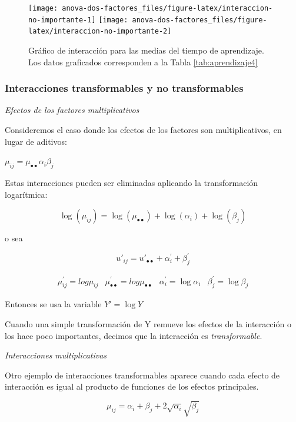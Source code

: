 \documentclass[]{book}
\theoremstyle{definition}
\theoremstyle{definition}
\theoremstyle{definition}
\theoremstyle{remark}
\begin{document}
\begin{figure}
\texttt{[image: anova-dos-factores\_files/figure-latex/interaccion-no-importante-1]} \texttt{[image: anova-dos-factores\_files/figure-latex/interaccion-no-importante-2]} \caption{Gráfico de interacción para las medias
del tiempo de aprendizaje. Los datos graficados corresponden a la Tabla
\ref{tab:aprendizaje4}}\label{fig:interaccion-no-importante}
\end{figure}

\hypertarget{interacciones-transformables-y-no-transformables}{%
\subsubsection{Interacciones transformables y no
transformables}\label{interacciones-transformables-y-no-transformables}}

\emph{Efectos de los factores multiplicativos}

Consideremos el caso donde los efectos de los factores son
multiplicativos, en lugar de aditivos:

\(\mu_{ij} = \mu_{\bullet \bullet}\alpha_{i}\beta_{j}\)

Estas interacciones pueden ser eliminadas aplicando la transformación
logarítmica:

\[
\log(\mu_{ij}) = \log(\mu_{\bullet \bullet}) + \log(\alpha_{i}) + \log(\beta_{j})
\]

o sea

\[
{u'}_{ij} = {u'}_{\bullet \bullet} + \alpha_{i}^{'} + \beta_{j}^{'}
\]

\[
\begin{matrix}
\mu_{ij}^{'} = log \mu_{ij} & \mu_{\bullet \bullet}^{'} = log \mu_{\bullet \bullet} & \alpha_{i}^{'} = \log\alpha_{i} & \beta_{j}^{'} = \log\beta_{j}
\end{matrix}
\]

Entonces se usa la variable \(Y' = \log Y\)

Cuando una simple transformación de Y remueve los efectos de la
interacción o los hace poco importantes, decimos que la interacción es
\emph{transformable}.

\emph{Interacciones multiplicativas}

Otro ejemplo de interacciones transformables aparece cuando cada efecto
de interacción es igual al producto de funciones de los efectos
principales.

\[
\mu_{ij} = \alpha_{i} + \beta_{j} + 2\sqrt{\alpha_{i}}\sqrt{\beta_{j}}
\]
\end{document}
